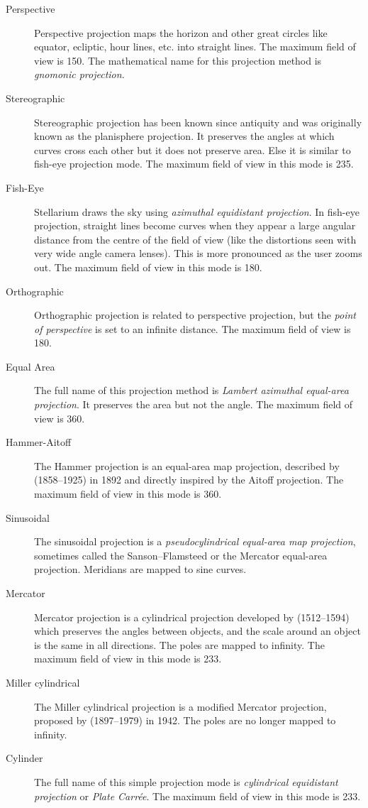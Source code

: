 \begin{description}
  \item[Perspective] Perspective projection maps the horizon and other
    great circles like equator, ecliptic, hour lines, etc. into
    straight lines. The maximum field of view is 150\degree. The
    mathematical name for this projection method is \emph{gnomonic
      projection}.
  \item[Stereographic] Stereographic projection has been known since
    antiquity and was originally known as the planisphere
    projection. It preserves the angles at which curves cross each
    other but it does not preserve area. Else it is similar to
    fish-eye projection mode. The maximum field of view in this mode
    is 235\degree.
  \item[Fish-Eye] Stellarium draws the sky using \emph{azimuthal
    equidistant projection}. In fish-eye projection, straight lines
    become curves when they appear a large angular distance from the
    centre of the field of view (like the distortions seen with very
    wide angle camera lenses). This is more pronounced as the user zooms
    out. The maximum field of view in this mode is 180\degree.
  \item[Orthographic] Orthographic projection is related to
    perspective projection, but the \emph{point of perspective} is set
    to an infinite distance. The maximum field of view is 180\degree.
  \item[Equal Area] The full name of this projection method is
    \emph{Lambert azimuthal equal-area projection}. It preserves the
    area but not the angle. The maximum field of view is 360\degree.
  \item[Hammer-Aitoff] The Hammer projection is an equal-area map
    projection, described by  (1858--1925) in 1892 and directly inspired
    by the Aitoff projection. The maximum field of view in this mode is
    360\degree.
  \item[Sinusoidal] The sinusoidal projection is a
    \emph{pseudocylindrical equal-area map projection}, sometimes
    called the Sanson--Flamsteed or the Mercator equal-area
    projection. Meridians are mapped to sine curves.
  \item[Mercator] Mercator projection is a cylindrical projection developed 
    by  (1512--1594)
    which preserves the angles between objects, and the scale around
    an object is the same in all directions. The poles are mapped to
    infinity.  The maximum field of view in this mode is 233\degree.
  \item[Miller cylindrical] The Miller cylindrical projection is a
    modified Mercator projection, proposed by 
    (1897--1979) in 1942. The poles are no longer mapped to
    infinity.
  \item[Cylinder] The full name of this simple projection mode is
    \emph{cylindrical equidistant projection} or \emph{Plate
      Carr\'ee}. The maximum field of view in this mode is 233\degree.
\end{description}

